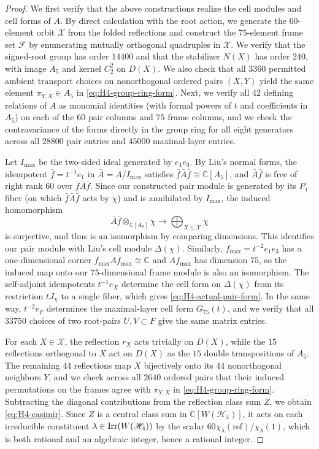 \documentclass[11pt,a4paper]{amsart}
\theoremstyle{uprightdefinition}
\theoremstyle{remark}\newtheorem{remark}[theorem]{Remark}
\begin{document}
\begin{proof}
We first verify that the above constructions realize the cell modules and cell forms of $A$.
By direct calculation with the root action, we generate the $60$-element orbit $\mathcal X$ from the folded reflections and construct
the $75$-element frame set $\mathcal F$ by enumerating mutually orthogonal quadruples in $\mathcal X$. We verify that the
signed-root group has order $14400$ and that the stabilizer $N(X)$ has order $240$, with image $A_5$ and kernel $C_2^2$ on $D(X)$.
We also check that all $3360$ permitted ambient transport choices on
nonorthogonal ordered pairs $(X,Y)$ yield the same element $\pi_{Y,X}\in A_5$ in
\eqref{eq:H4-group-ring-form}. Next, we verify all $42$ defining relations of $A$ as
monomial identities (with formal powers of $t$ and coefficients in $A_5$) on each of the $60$ pair columns and $75$ frame columns,
and we check the contravariance of the forms directly
in the group ring for all eight generators across all $28800$ pair entries and
$45000$ maximal-layer entries.

Let $I_{\max}$ be the two-sided ideal generated by $e_1e_3$. By Liu's normal forms, the idempotent
$\bar f=t^{-1}e_1$ in $\bar A=A/I_{\max}$ satisfies
$\bar f\bar A\bar f\cong\mathbb C[A_5]$, and $\bar A\bar f$ is free of
right rank $60$ over $\bar f\bar A\bar f$. Since our constructed pair module is generated
by its $P_1$ fiber (on which $\bar f\bar A\bar f$ acts by $\chi$) and is annihilated by $I_{\max}$, the induced homomorphism
\[
 \bar A\bar f\otimes_{\mathbb C[A_5]}\chi\longrightarrow
 \bigoplus_{X\in\mathcal X}\chi
\]
is surjective, and thus is an isomorphism by comparing dimensions. This identifies
our pair module with Liu's cell module $\Delta(\chi)$. Similarly,
$f_{\max}=t^{-2}e_1e_3$ has a one-dimensional corner $f_{\max}Af_{\max}\cong\mathbb C$ and $Af_{\max}$ has dimension
$75$, so the induced map onto our $75$-dimensional frame module is also an isomorphism. The
self-adjoint idempotents $t^{-1}e_X$ determine the cell form on $\Delta(\chi)$ from its
restriction $tJ_\chi$ to a single fiber, which gives
\eqref{eq:H4-actual-pair-form}. In the same way, $t^{-2}e_F$ determines the maximal-layer cell form $G_{75}(t)$, and we verify that all $33750$ choices of
two root-pairs $U,V\subset F$ give the same matrix entries.

For each $X\in\mathcal X$, the reflection $r_X$ acts trivially on $D(X)$, while the $15$
reflections orthogonal to $X$ act on $D(X)$ as the $15$ double transpositions of $A_5$.
The remaining $44$ reflections map $X$ bijectively onto its $44$ nonorthogonal
neighbors $Y$, and we check across all $2640$ ordered pairs that their induced permutations on the frames agree with $\pi_{Y,X}$ in
\eqref{eq:H4-group-ring-form}.
Subtracting the diagonal contributions from the reflection class sum $Z$, we obtain
\eqref{eq:H4-casimir}. Since $Z$ is a central class sum in
$\mathbb C[W(\mathscr{H}_4)]$, it acts on each irreducible constituent $\lambda\in\operatorname{Irr}(W(\mathscr{H}_4))$ by the scalar
$60\chi_\lambda(\mathrm{ref})/\chi_\lambda(1)$, which is both rational and an algebraic integer, hence a rational integer.


\end{proof}
\end{document}
